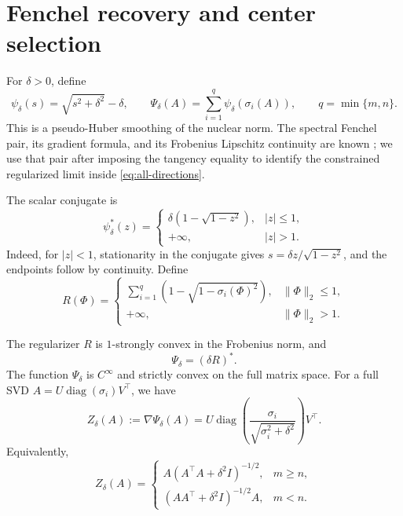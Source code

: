 \section{Fenchel recovery and center selection}
\label{sec:smoothing}

For \(\delta>0\), define
\begin{equation}
 \psi_\delta(s)=\sqrt{s^2+\delta^2}-\delta,
 \qquad
 \Psi_\delta(A)=\sum_{i=1}^{q}\psi_\delta(\sigma_i(A)),
 \qquad q=\min\{m,n\}.
 \label{eq:Psi-main}
\end{equation}
This is a pseudo-Huber smoothing of the nuclear norm.  The spectral Fenchel
pair, its gradient formula, and its Frobenius Lipschitz continuity are known
\citep{mustafi2026move,lobos2025smooth,feoktistov2026softsign}; we use that
pair after imposing the tangency equality to identify the constrained
regularized limit inside \eqref{eq:all-directions}.

The scalar conjugate is
\begin{equation}
 \psi_\delta^*(z)=
 \begin{cases}
 \delta(1-\sqrt{1-z^2}),&|z|\le1,\\
 +\infty,&|z|>1.
 \end{cases}
 \label{eq:scalar-conjugate-main}
\end{equation}
Indeed, for \(|z|<1\), stationarity in the conjugate gives
\(s=\delta z/\sqrt{1-z^2}\), and the endpoints follow by continuity.
Define
\begin{equation}
 R(\Phi)=
 \begin{cases}
 \displaystyle\sum_{i=1}^{q}\left(1-\sqrt{1-\sigma_i(\Phi)^2}\right),
       &\|\Phi\|_2\le1,\\
 +\infty,&\|\Phi\|_2>1.
 \end{cases}
 \label{eq:R-main}
\end{equation}

\begin{lemma}
\label{lem:conjugacy}
The regularizer \(R\) is \(1\)-strongly convex in the Frobenius norm, and
\begin{equation}
 \Psi_\delta=(\delta R)^*.
 \label{eq:matrix-conjugacy-main}
\end{equation}
The function \(\Psi_\delta\) is \(C^\infty\) and strictly convex on the full
matrix space.  For a full SVD \(A=U\operatorname{diag}(\sigma_i)V^\top\),
we have
\begin{equation}
 Z_\delta(A):=\nabla\Psi_\delta(A)
 =U\operatorname{diag}\left(
 \frac{\sigma_i}{\sqrt{\sigma_i^2+\delta^2}}
 \right)V^\top.
 \label{eq:Zdelta}
\end{equation}
Equivalently,
\begin{equation}
 Z_\delta(A)=
 \begin{cases}
 A(A^\top A+\delta^2I)^{-1/2},&m\ge n,\\
 (AA^\top+\delta^2I)^{-1/2}A,&m<n.
 \end{cases}
 \label{eq:Zdelta-coordinate-free}
\end{equation}
\end{lemma}

